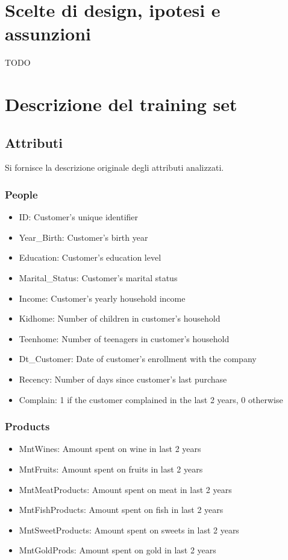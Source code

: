 \documentclass[letterpaper,11pt]{article}
\begin{document}
\section{Scelte di design, ipotesi e assunzioni}
TODO

\section{Descrizione del training set}
\subsection{Attributi}
Si fornisce la descrizione originale degli attributi analizzati.
\subsubsection*{People}
\begin{itemize}
    \item ID: Customer's unique identifier
    \item Year\_Birth: Customer's birth year
    \item Education: Customer's education level
    \item Marital\_Status: Customer's marital status
    \item Income: Customer's yearly household income
    \item Kidhome: Number of children in customer's household
    \item Teenhome: Number of teenagers in customer's household
    \item Dt\_Customer: Date of customer's enrollment with the company
    \item Recency: Number of days since customer's last purchase
    \item Complain: 1 if the customer complained in the last 2 years, 0 otherwise
\end{itemize}


\subsubsection*{Products}
\begin{itemize}
\item MntWines: Amount spent on wine in last 2 years
\item MntFruits: Amount spent on fruits in last 2 years
\item MntMeatProducts: Amount spent on meat in last 2 years
\item MntFishProducts: Amount spent on fish in last 2 years
\item MntSweetProducts: Amount spent on sweets in last 2 years
\item MntGoldProds: Amount spent on gold in last 2 years
\end{itemize}
\end{document}
